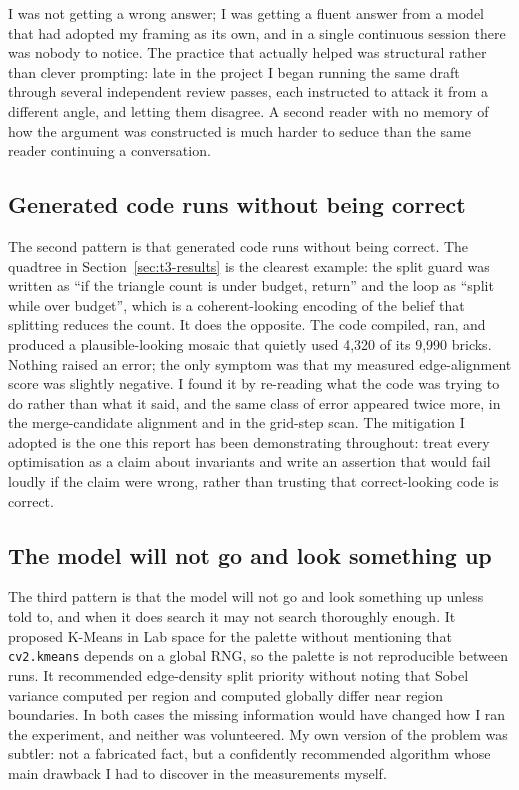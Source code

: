 \documentclass[11pt,a4paper]{article}
\begin{document}
I was not getting a wrong answer; I was getting a fluent answer from a model
that had adopted my framing as its own, and in a single continuous session there
was nobody to notice. The practice that actually helped was structural rather
than clever prompting: late in the project I began running the same draft
through several independent review passes, each instructed to attack it from a
different angle, and letting them disagree. A second reader with no memory of how
the argument was constructed is much harder to seduce than the same reader
continuing a conversation.

\FloatBarrier
\FloatBarrier
\subsection{Generated code runs without being correct}
\label{sec:ai-code}

The second pattern is that generated code runs without being correct. The
quadtree in Section~\ref{sec:t3-results} is the clearest example: the split guard
was written as ``if the triangle count is under budget, return'' and the loop as
``split while over budget'', which is a coherent-looking encoding of the belief
that splitting reduces the count. It does the opposite. The code compiled, ran,
and produced a plausible-looking mosaic that quietly used 4{,}320 of its
9{,}990 bricks. Nothing raised an error; the only symptom was that my measured
edge-alignment score was slightly negative. I found it by re-reading what the
code was trying to do rather than what it said, and the same class of error
appeared twice more, in the merge-candidate alignment and in the grid-step scan.
The mitigation I adopted is the one this report has been demonstrating
throughout: treat every optimisation as a claim about invariants and write an
assertion that would fail loudly if the claim were wrong, rather than trusting
that correct-looking code is correct.

\FloatBarrier
\FloatBarrier
\subsection{The model will not go and look something up}

The third pattern is that the model will not go and look something up unless told
to, and when it does search it may not search thoroughly enough. It proposed
K-Means in Lab space for the palette without mentioning that
\texttt{cv2.kmeans} depends on a global RNG, so the palette is not reproducible
between runs. It recommended edge-density split priority without noting that
Sobel variance computed per region and computed globally differ near region
boundaries. In both cases the missing information would have changed how I ran
the experiment, and neither was volunteered. My own version of the problem was
subtler: not a fabricated fact, but a confidently recommended algorithm whose
main drawback I had to discover in the measurements myself.
\end{document}
